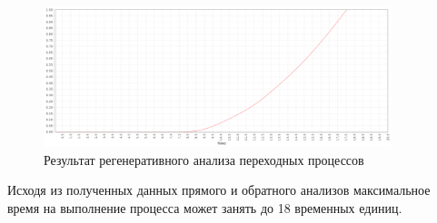 \begin{figure}[h!btp]
	\centering
	\includegraphics[width=0.9\textwidth]{inc/stud_prob.png}
	\caption{Результат регенеративного анализа переходных процессов}
	\label{fig:sp}
\end{figure}

Исходя из полученных данных прямого и обратного анализов максимальное время на выполнение процесса может занять до 18 временных единиц.